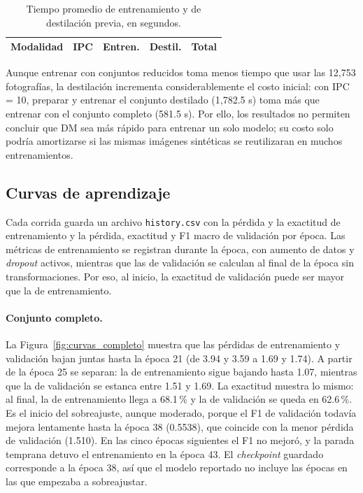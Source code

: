 \begin{table}[htbp]
\centering
\caption{Tiempo promedio de entrenamiento y de destilación previa, en segundos.}
\label{tab:costos}
\small
\begin{tabular}{lcrrr}
\toprule
Modalidad & IPC & Entren. & Destil. & Total \\
\midrule

\end{tabular}
\end{table}

Aunque entrenar con conjuntos reducidos toma menos tiempo que usar las 12,753 fotografías, la destilación incrementa considerablemente el costo inicial: con IPC = 10, preparar y entrenar el conjunto destilado (1,782.5 s) toma más que entrenar con el conjunto completo (581.5 s). Por ello, los resultados no permiten concluir que DM sea más rápido para entrenar un solo modelo; su costo solo podría amortizarse si las mismas imágenes sintéticas se reutilizaran en muchos entrenamientos.

\subsection{Curvas de aprendizaje}
Cada corrida guarda un archivo \texttt{history.csv} con la pérdida y la exactitud de entrenamiento y la pérdida, exactitud y F1 macro de validación por época. Las métricas de entrenamiento se registran durante la época, con aumento de datos y \textit{dropout} activos, mientras que las de validación se calculan al final de la época sin transformaciones. Por eso, al inicio, la exactitud de validación puede ser mayor que la de entrenamiento.

\paragraph{Conjunto completo.} La Figura~\ref{fig:curvas_completo} muestra que las pérdidas de entrenamiento y validación bajan juntas hasta la época 21 (de 3.94 y 3.59 a 1.69 y 1.74). A partir de la época 25 se separan: la de entrenamiento sigue bajando hasta 1.07, mientras que la de validación se estanca entre 1.51 y 1.69. La exactitud muestra lo mismo: al final, la de entrenamiento llega a 68.1\,\% y la de validación se queda en 62.6\,\%. Es el inicio del sobreajuste, aunque moderado, porque el F1 de validación todavía mejora lentamente hasta la época 38 (0.5538), que coincide con la menor pérdida de validación (1.510). En las cinco épocas siguientes el F1 no mejoró, y la parada temprana detuvo el entrenamiento en la época 43. El \textit{checkpoint} guardado corresponde a la época 38, así que el modelo reportado no incluye las épocas en las que empezaba a sobreajustar.

